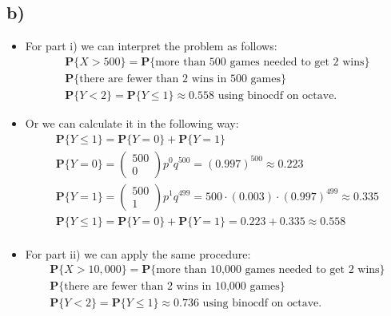 \documentclass[12pt]{article}
\begin{document}
\subsection*{b)} 
\begin{itemize}
 \item For part i) we can interpret the problem as follows:
 \begin{equation*}
    \begin{split}
        \textbf{P}\{X > 500\}=\textbf{P}\{\text{more than 500 games needed to get 2 wins}\}\\
        \textbf{P}\{\text{there are fewer than 2 wins in 500 games}\}\\
        \textbf{P}\{Y < 2\} = \textbf{P}\{Y \leq 1\} \approx 0.558 \text{ using binocdf on octave.}
    \end{split}
 \end{equation*}
 \item Or we can calculate it in the following way:
 \begin{equation*}
    \begin{split}
        \textbf{P}\{Y \leq 1\} = \textbf{P}\{Y = 0\} + \textbf{P}\{Y = 1\}\\
        \textbf{P}\{Y = 0\} = \begin{pmatrix} 500 \\ 0 \end{pmatrix}p^0q^{500} = (0.997)^{500} \approx 0.223\\
        \textbf{P}\{Y = 1\} = \begin{pmatrix} 500 \\ 1 \end{pmatrix}p^1q^{499} = 500\cdot(0.003)\cdot(0.997)^{499} \approx 0.335\\
        \textbf{P}\{Y \leq 1\} = \textbf{P}\{Y = 0\} + \textbf{P}\{Y = 1\} = 0.223 + 0.335 \approx 0.558\\
    \end{split}
 \end{equation*}
 \item For part ii) we can apply the same procedure:
 \begin{equation*}
    \begin{split}
        \textbf{P}\{X > 10,000\}=\textbf{P}\{\text{more than 10,000 games needed to get 2 wins}\}\\
        \textbf{P}\{\text{there are fewer than 2 wins in 10,000 games}\}\\
        \textbf{P}\{Y < 2\} = \textbf{P}\{Y \leq 1\} \approx 0.736 \text{ using binocdf on octave.}

\end{split}
\end{equation*}
\end{itemize}
\end{document}
